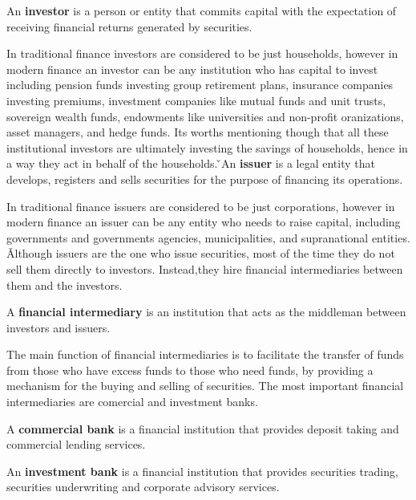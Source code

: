 \bd[Investor]
An \textbf{investor} is a person or entity that commits capital with the expectation of receiving financial returns
generated by securities.
\ed

In traditional finance investors are considered to be just households, however in modern finance an investor can be any
institution who has capital to invest including pension funds investing group retirement plans, insurance companies
investing premiums, investment companies like mutual funds and unit trusts, sovereign wealth funds, endowments like
universities and non-profit oranizations, asset managers, and hedge funds. Its worths mentioning though that all these
institutional investors are ultimately investing the savings of households, hence in a way they act in behalf of the
households. \v

\bd[Issuer]
An \textbf{issuer} is a legal entity that develops, registers and sells securities for the purpose of financing its
operations.
\ed

In traditional finance issuers are considered to be just corporations, however in modern finance an issuer can be any
entity who needs to raise capital, including governments and governments agencies, municipalities, and supranational
entities. \v

Although issuers are the one who issue securities, most of the time they do not sell them directly to investors.
Instead,they hire financial intermediaries between them and the investors.

A \textbf{financial intermediary} is an institution that acts as the middleman between investors and issuers.
\ed

The main function of financial intermediaries is to facilitate the transfer of funds from those who have excess funds
to those who need funds, by providing a mechanism for the buying and selling of securities. The most important
financial intermediaries are comercial and investment banks.


A \textbf{commercial bank} is a financial institution that provides deposit taking and commercial lending services.
\ed


An \textbf{investment bank} is a financial institution that provides securities trading, securities underwriting and
corporate advisory services.
\ed


